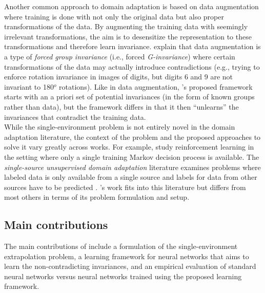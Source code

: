 Another common approach to domain adaptation is based on data augmentation \parencite{Chen:2020} where training is done with not only the original data but also proper transformations of the data. By augmenting the training data with seemingly irrelevant transformations, the aim is to desensitize the representation to these transformations and therefore learn invariance. \citeauthor{Mouli:2021} explain that data augmentation is a type of \textit{forced group invariance} (i.e., forced \textit{G-invariance}) where certain transformations of the data may actually introduce contradictions (e.g., trying to enforce rotation invariance in images of digits, but digits 6 and 9 are not invariant to 180$^o$ rotations). Like in data augmentation, \citeauthor{Mouli:2021}'s proposed framework starts with an a priori set of potential invariances (in the form of known groups rather than data), but the framework differs in that it then ``unlearns'' the invariances that contradict the training data.
\\

While the single-environment problem is not entirely novel in the domain adaptation literature, the context of the problem and the proposed approaches to solve it vary greatly across works. For example, \textcite{Kumar:2020} study reinforcement learning in the setting where only a single training Markov decision process is available. The \textit{single-source unsupervised domain adaptation} literature examines problems where labeled data is only available from a single source and labels for data from other sources have to be predicted \parencite{Zhao:2020}. \citeauthor{Mouli:2021}'s work fits into this literature but differs from most others in terms of its problem formulation and setup.


\subsection{Main contributions}

The main contributions of \textcite{Mouli:2021} include a formulation of the single-environment extrapolation problem, a learning framework for neural networks that aims to learn the non-contradicting invariances, and an empirical evaluation of standard neural networks versus neural networks trained using the proposed learning framework.
\\

